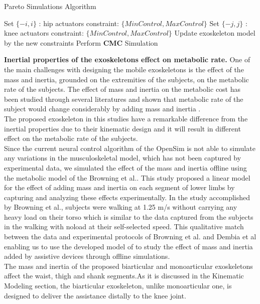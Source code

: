 \documentclass[10pt,letterpaper]{article}
\begin{document}
\begin{algorithm}\label{Algorithm_Pareto_simulation}
	\caption{Pareto Simulations Algorithm}\label{Pareto_Algorithm}
	\begin{algorithmic}[1]
		\State Set $\{-i,i\}$ : hip actuators constraint: $\{Min Control, Max Control\}$
		\State Set $\{-j,j\}$ : knee actuators constraint: $\{Min Control, Max Control\}$
		\State Update exoskeleton model by the new constraints
		\State Perform \textbf{CMC} Simulation
		\EndFor
		\EndFor
	\end{algorithmic}
\end{algorithm}
\textbf{Inertial properties of the exoskeletons effect on metabolic rate.} One of the main challenges with designing the mobile exoskeletons is the effect of the mass and inertia, grounded on the extremities of the subjects, on the metabolic rate of the subjects. The effect of mass and inertia on the metabolic cost has been studied through several literatures \cite{133,134} and shown that metabolic rate of the subject would change considerably by adding mass and inertia \cite{133,134,135}.\\
The proposed exoskeleton in this studies have a remarkable difference from the inertial properties due to their kinematic design and it will result in different effect on the metabolic rate of the subjects.\\
Since the current neural control algorithm of the OpenSim is not able to simulate any variations in the musculoskeletal model, which has not been captured by experimental data, we simulated the effect of the mass and inertia offline using the metabolic model of the Browning et al.\cite{133}. This study proposed a linear model for the effect of adding mass and inertia on each segment of lower limbs by capturing and analyzing these effects experimentally. In the study accomplished by Browning et al.\cite{133}, subjects were walking at 1.25 m/s without carrying any heavy load on their torso which is similar to the data captured from the subjects in the walking with noload at their self-selected speed\cite{93}. This qualitative match between the data and experimental protocols of Browning et al. and Dembia et al enabling us to use the developed model of \cite{133}  to study the effect of mass and inertia added by assistive devices through offline simulations.\\
The mass and inertia of the proposed biarticular and monoarticular exoskeletons affect the waist, thigh and shank segments.As it is discussed in the Kinematic Modeling section, the biarticular exoskeleton, unlike monoarticular one, is designed to deliver the assistance distally to the knee joint.
\end{document}
